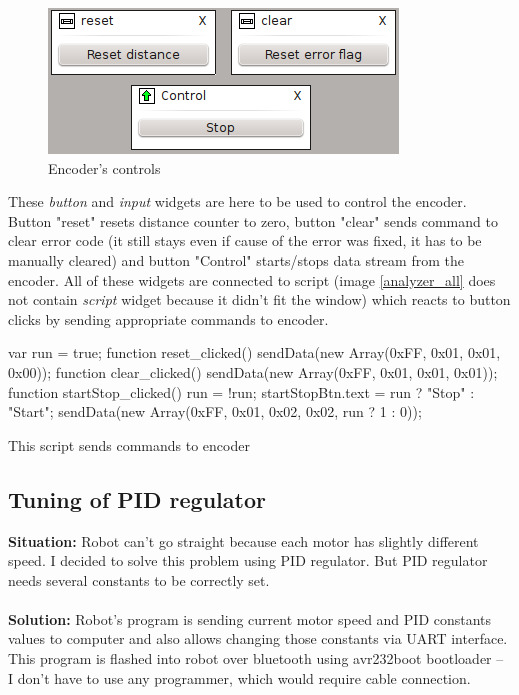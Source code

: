 \documentclass[12pt, a4paper, oneside]{article}
\newcommand{\It}{\textit}  %
\begin{document}
\begin{figure}[H]
\begin{center}
\includegraphics[width=\textwidth-50pt]{img/enc_ctrl.png}
\caption{Encoder's controls}
\end{center}
\end{figure}
These \It{button} and \It{input} widgets are here to be used to control the encoder. Button "reset" resets distance counter to zero, button "clear" sends command to clear error code (it still stays even if cause of the error was fixed, it has to be manually cleared) and button "Control" starts/stops data stream from the encoder. All of these widgets are connected to script (image \ref{analyzer_all} does not contain \It{script} widget because it didn't fit the window) which reacts to button clicks by sending appropriate commands to encoder.

\begin{listing}[H]
\begin{jscode}
var run = true;
function reset_clicked() {
    sendData(new Array(0xFF, 0x01, 0x01, 0x00));
}
function clear_clicked() {
    sendData(new Array(0xFF, 0x01, 0x01, 0x01));
}
function startStop_clicked() {
    run = !run;
    startStopBtn.text = run ? "Stop" : "Start";
    sendData(new Array(0xFF, 0x01, 0x02, 0x02, run ? 1 : 0));
}
\end{jscode}
\caption{This script sends commands to encoder}
\end{listing}

\newpage
\subsection{Tuning of PID regulator}
{\bf Situation:} Robot can't go straight because each motor has slightly different speed. I decided to solve this problem using PID regulator. But PID regulator needs several constants to be correctly set. \\
\\
{\bf Solution:} Robot's program is sending current motor speed and PID constants values to computer and also allows changing those constants via UART interface. This program is flashed into robot over bluetooth using avr232boot bootloader -- I don't have to use any programmer, which would require cable connection.
\end{document}
